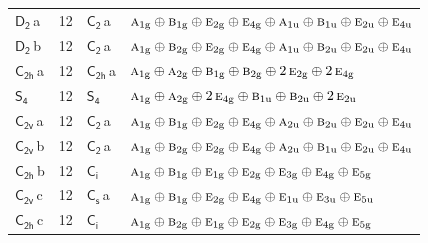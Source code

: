 \documentclass[10pt,a4paper]{article}
\numberwithin{equation}{section}
\newcommand{\grp}[1]{\mathsf{#1}}
\newcommand{\irr}[1]{\text{\normalfont\scshape #1}}
\newcommand{\ptag}[1]{\mathrm{#1}}
\newcommand{\clsletter}[1]{\,{\scriptsize\color{black!55}#1}}
\newlength{\fillwidth}\newlength{\cellwidth}\newlength{\colwidth}
\begin{document}
{\begin{longtable}{@{}lrl>{\RaggedRight\arraybackslash}p{\fillwidth}@{}}
\href{D2.pdf}{$\grp{D_{2}}$}\clsletter{a} & 12 & \href{C2.pdf}{$\grp{C_{2}}$}\clsletter{a} & $\irr{a}_{1\ptag{g}}\oplus \irr{b}_{1\ptag{g}}\oplus \irr{e}_{2\ptag{g}}\oplus \irr{e}_{4\ptag{g}}\oplus \irr{a}_{1\ptag{u}}\oplus \irr{b}_{1\ptag{u}}\oplus \irr{e}_{2\ptag{u}}\oplus \irr{e}_{4\ptag{u}}$\\
\href{D2.pdf}{$\grp{D_{2}}$}\clsletter{b} & 12 & \href{C2.pdf}{$\grp{C_{2}}$}\clsletter{a} & $\irr{a}_{1\ptag{g}}\oplus \irr{b}_{2\ptag{g}}\oplus \irr{e}_{2\ptag{g}}\oplus \irr{e}_{4\ptag{g}}\oplus \irr{a}_{1\ptag{u}}\oplus \irr{b}_{2\ptag{u}}\oplus \irr{e}_{2\ptag{u}}\oplus \irr{e}_{4\ptag{u}}$\\
\href{C2h.pdf}{$\grp{C_{2h}}$}\clsletter{a} & 12 & \href{C2h.pdf}{$\grp{C_{2h}}$}\clsletter{a} & $\irr{a}_{1\ptag{g}}\oplus \irr{a}_{2\ptag{g}}\oplus \irr{b}_{1\ptag{g}}\oplus \irr{b}_{2\ptag{g}}\oplus 2\,\irr{e}_{2\ptag{g}}\oplus 2\,\irr{e}_{4\ptag{g}}$\\
\href{S4.pdf}{$\grp{S_{4}}$} & 12 & \href{S4.pdf}{$\grp{S_{4}}$} & $\irr{a}_{1\ptag{g}}\oplus \irr{a}_{2\ptag{g}}\oplus 2\,\irr{e}_{4\ptag{g}}\oplus \irr{b}_{1\ptag{u}}\oplus \irr{b}_{2\ptag{u}}\oplus 2\,\irr{e}_{2\ptag{u}}$\\
\href{C2v.pdf}{$\grp{C_{2v}}$}\clsletter{a} & 12 & \href{C2.pdf}{$\grp{C_{2}}$}\clsletter{a} & $\irr{a}_{1\ptag{g}}\oplus \irr{b}_{1\ptag{g}}\oplus \irr{e}_{2\ptag{g}}\oplus \irr{e}_{4\ptag{g}}\oplus \irr{a}_{2\ptag{u}}\oplus \irr{b}_{2\ptag{u}}\oplus \irr{e}_{2\ptag{u}}\oplus \irr{e}_{4\ptag{u}}$\\
\href{C2v.pdf}{$\grp{C_{2v}}$}\clsletter{b} & 12 & \href{C2.pdf}{$\grp{C_{2}}$}\clsletter{a} & $\irr{a}_{1\ptag{g}}\oplus \irr{b}_{2\ptag{g}}\oplus \irr{e}_{2\ptag{g}}\oplus \irr{e}_{4\ptag{g}}\oplus \irr{a}_{2\ptag{u}}\oplus \irr{b}_{1\ptag{u}}\oplus \irr{e}_{2\ptag{u}}\oplus \irr{e}_{4\ptag{u}}$\\
\href{C2h.pdf}{$\grp{C_{2h}}$}\clsletter{b} & 12 & \href{S2.pdf}{$\grp{C_{i}}$} & $\irr{a}_{1\ptag{g}}\oplus \irr{b}_{1\ptag{g}}\oplus \irr{e}_{1\ptag{g}}\oplus \irr{e}_{2\ptag{g}}\oplus \irr{e}_{3\ptag{g}}\oplus \irr{e}_{4\ptag{g}}\oplus \irr{e}_{5\ptag{g}}$\\
\href{C2v.pdf}{$\grp{C_{2v}}$}\clsletter{c} & 12 & \href{C1v.pdf}{$\grp{C_{s}}$}\clsletter{a} & $\irr{a}_{1\ptag{g}}\oplus \irr{b}_{1\ptag{g}}\oplus \irr{e}_{2\ptag{g}}\oplus \irr{e}_{4\ptag{g}}\oplus \irr{e}_{1\ptag{u}}\oplus \irr{e}_{3\ptag{u}}\oplus \irr{e}_{5\ptag{u}}$\\
\href{C2h.pdf}{$\grp{C_{2h}}$}\clsletter{c} & 12 & \href{S2.pdf}{$\grp{C_{i}}$} & $\irr{a}_{1\ptag{g}}\oplus \irr{b}_{2\ptag{g}}\oplus \irr{e}_{1\ptag{g}}\oplus \irr{e}_{2\ptag{g}}\oplus \irr{e}_{3\ptag{g}}\oplus \irr{e}_{4\ptag{g}}\oplus \irr{e}_{5\ptag{g}}$\\

\end{longtable}}
\end{document}
